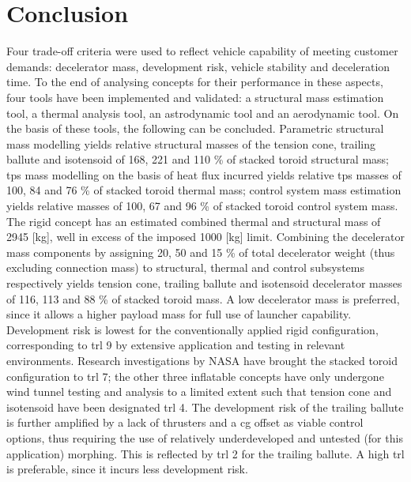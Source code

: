 \section{Conclusion}\label{cha:conclusion}
Four trade-off criteria were used to reflect vehicle capability of meeting customer demands: decelerator mass, development risk, vehicle stability and deceleration time. To the end of analysing concepts for their performance in these aspects, four tools have been implemented and validated: a structural mass estimation tool, a thermal analysis tool, an astrodynamic tool and an aerodynamic tool. On the basis of these tools, the following can be concluded.
\newline
\newline
Parametric structural mass modelling yields relative structural masses of the tension cone, trailing ballute and isotensoid of 168, 221 and 110 \% of stacked toroid structural mass; \acrfull{tps} mass modelling on the basis of heat flux incurred yields relative \gls{tps} masses of 100, 84 and 76 \% of stacked toroid thermal mass; control system mass estimation yields relative masses of 100, 67 and 96 \% of stacked toroid control system mass. The rigid concept has an estimated combined thermal and structural mass of 2945 [kg], well in excess of the imposed 1000 [kg] limit. Combining the decelerator mass components by assigning 20, 50 and 15 \% of total decelerator weight (thus excluding connection mass) to structural, thermal and control subsystems respectively yields tension cone, trailing ballute and isotensoid decelerator masses of 116, 113 and 88 \% of stacked toroid mass. A low decelerator mass is preferred, since it allows a higher payload mass for full use of launcher capability.
\newline
\newline
Development risk is lowest for the conventionally applied rigid configuration, corresponding to \acrfull{trl} 9 by extensive application and testing in relevant environments. Research investigations by NASA have brought the stacked toroid configuration to \gls{trl} 7; the other three inflatable concepts have only undergone wind tunnel testing and analysis to a limited extent such that tension cone and isotensoid have been designated \gls{trl} 4. The development risk of the trailing ballute is further amplified by a lack of thrusters and a \gls{cg} offset as viable control options, thus requiring the use of relatively underdeveloped and untested (for this application) morphing. This is reflected by \gls{trl} 2 for the trailing ballute. A high \gls{trl} is preferable, since it incurs less development risk.
